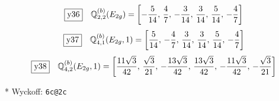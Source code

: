 \documentclass[fleqn,10pt,landscape]{jsarticle}
\begin{document}
\begin{dmath*}
\fbox{y36}\quad \mathbb{Q}_{2,2}^{(b)}(E_{2g})=\left[ - \frac{5}{14},\, \frac{4}{7},\, - \frac{3}{14},\, \frac{3}{14},\, \frac{5}{14},\, - \frac{4}{7} \right]
\end{dmath*}
\begin{dmath*}
\fbox{y37}\quad \mathbb{Q}_{4,1}^{(b)}(E_{2g},1)=\left[ \frac{5}{14},\, - \frac{4}{7},\, \frac{3}{14},\, \frac{3}{14},\, \frac{5}{14},\, - \frac{4}{7} \right]
\end{dmath*}
\begin{dmath*}
\fbox{y38}\quad \mathbb{Q}_{4,2}^{(b)}(E_{2g},1)=\left[ \frac{11 \sqrt{3}}{42},\, \frac{\sqrt{3}}{21},\, - \frac{13 \sqrt{3}}{42},\, \frac{13 \sqrt{3}}{42},\, - \frac{11 \sqrt{3}}{42},\, - \frac{\sqrt{3}}{21} \right]
\end{dmath*}
\vspace{5mm}

\noindent ** Wyckoff: \texttt{6c@2c}
\end{document}
